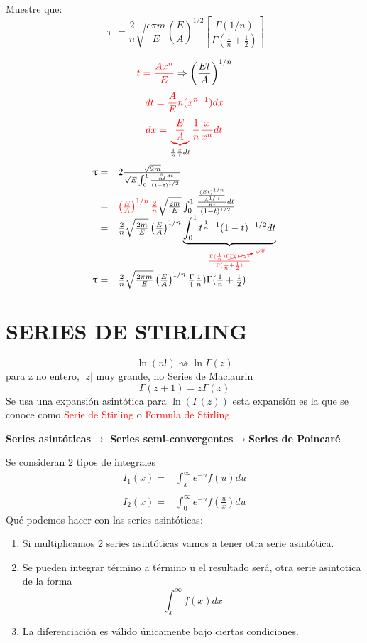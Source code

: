 \documentclass{article}
\theoremstyle{definition}
\begin{document}
Muestre que:
\[\uptau=\frac{2}{n}\sqrt{\frac{e\pi m}{E}}\left(\frac{E}{A}\right)^{1/2}\left[\frac{\Gamma (1/n)}{\Gamma (\frac{1}{n}+\frac{1}{2})}\right]\]
\begin{center}
\end{center}
\[\textcolor{red}{t=\frac{Ax^n}{E}}\Rightarrow \left(\frac{Et}{A}\right)^{1/n}\]
\[\textcolor{red}{dt=\frac{A}{E}n(x^{n-1})dx}\]
\[\textcolor{red}{dx=\underbrace{\frac{E}{A}}_{\textcolor{black}{\frac{1}{n}\frac{x}{t}dt}}\frac{1}{n}\frac{x}{x^n}dt}\]
\[
\begin{array}{rl}
	\uptau =& 2\frac{\sqrt{2m}}{\sqrt{E}\int^1_0\frac{\frac{x}{nt}dt}{(1-t)^{1/2}}}\\
	=&\textcolor{red}{\left(\frac{E}{A}\right)^{1/n}\frac{2}{n}}\sqrt{\frac{2m}{E}}\int^1_0\frac{\frac{\frac{(Et)^{1/n}}{A^{1/n}}}{nt}dt}{(1-t)^{1/2}}\\
	=&\frac{2}{n}\sqrt{\frac{2m}{E}}\left(\frac{E}{A}\right)^{1/n}\underbrace{\int^1_0t^{\frac{1}{n}-1}(1-t)^{-1/2}dt}_{\textcolor{red}{\frac{\Gamma (\frac{1}{n})\Gamma \cancelto{\sqrt{\pi}}{\Gamma (1/2)}}{\Gamma (\frac{1}{n}+\frac{1}{2})}}}\\
	\uptau =& \frac{2}{n}\sqrt{\frac{2\pi m}{E}}\left(\frac{E}{A}\right)^{1/n}\frac{\Gamma} (\frac{1}{n}){\Gamma (\frac{1}{n}+\frac{1}{2})}
\end{array}
\]
\section{SERIES DE STIRLING}
\[\ln (n!)\rightsquigarrow \ln \Gamma (z)\]
para z no entero, $|z|$ muy grande, no Series de Maclaurin
\[\Gamma (z+1)=z\Gamma (z)\]
Se usa una expansión asintótica para $\ln (\Gamma (z))$ esta expansión es la que se conoce como \textcolor{red}{Serie de Stirling} o \textcolor{red}{Formula de Stirling}

\textbf{Series asintóticas$\to$ Series semi-convergentes$\to$Series de Poincaré}

Se consideran 2 tipos de integrales 
\[
\begin{array}{rl}
	I_1 (x)=& \int^{\infty}_xe^{-u}f(u)du\\
	\\
	I_2 (x)=& \int^{\infty}_0e^{-u}f\left(\frac{u}{x}\right)du
\end{array}
\]
Qué podemos hacer con las series asintóticas:
\begin{enumerate}
	\item Si multiplicamos 2 series asintóticas vamos a tener otra serie asintótica.
	\item Se pueden integrar término a término u el resultado será, otra serie asintotica de la forma
	\[\int^{\infty}_xf(x)dx\]
	\item La diferenciación es válido únicamente bajo ciertas condiciones.
\end{enumerate}
\end{document}

